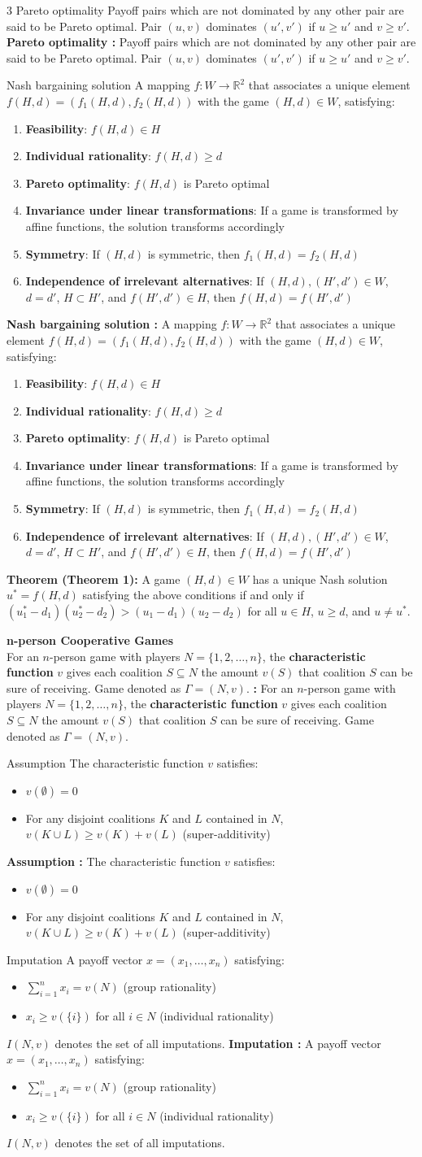 \documentclass[a4paper,landscape,8pt]{article}
\newcommand{\subheading}[1]{\vspace{1pt}\noindent\textbf{\textcolor{subheading}{#1}}}
\newcommand{\definition}[2][]{\vspace{1pt}\noindent%
  \ifx\relax#1\relax%
    #2%
  \else%
    \textbf{#1 :} #2%
  \fi}
\newcommand{\theorem}[2]{\vspace{1pt}\noindent\textbf{Theorem (#1):} #2}
\begin{document}
\begin{multicols}{3}
	\definition[Pareto optimality]{Payoff pairs which are not dominated by any other pair are said to be Pareto optimal. Pair $(u, v)$ dominates $(u', v')$ if $u \geq u'$ and $v \geq v'$.}

	\definition[Nash bargaining solution]{A mapping $f : W \rightarrow \mathbb{R}^2$ that associates a unique element $f(H, d) = (f_1(H, d), f_2(H, d))$ with the game $(H, d) \in W$, satisfying:
		\begin{enumerate}[leftmargin=10pt,itemsep=0pt]
			\item \textbf{Feasibility}: $f(H, d) \in H$
			\item \textbf{Individual rationality}: $f(H, d) \geq d$
			\item \textbf{Pareto optimality}: $f(H, d)$ is Pareto optimal
			\item \textbf{Invariance under linear transformations}: If a game is transformed by affine functions, the solution transforms accordingly
			\item \textbf{Symmetry}: If $(H, d)$ is symmetric, then $f_1(H, d) = f_2(H, d)$
			\item \textbf{Independence of irrelevant alternatives}: If $(H, d),(H', d') \in W$, $d = d'$, $H \subset H'$, and $f(H', d') \in H$, then $f(H, d) = f(H', d')$
		\end{enumerate}}

	\theorem{Theorem 1}{A game $(H, d) \in W$ has a unique Nash solution $u^* = f(H, d)$ satisfying the above conditions if and only if $(u^*_1 - d_1)(u^*_2 - d_2) > (u_1 - d_1)(u_2 - d_2)$ for all $u \in H$, $u \geq d$, and $u \neq u^*$.}

	\subheading{n-person Cooperative Games}\\
	\definition{For an $n$-person game with players $N = \{1, 2, \ldots, n\}$, the \textbf{characteristic function} $v$ gives each coalition $S \subseteq N$ the amount $v(S)$ that coalition $S$ can be sure of receiving. Game denoted as $\Gamma = (N, v)$.}

	\definition[Assumption]{The characteristic function $v$ satisfies:
		\begin{itemize}[leftmargin=10pt,itemsep=0pt]
			\item $v(\emptyset) = 0$
			\item For any disjoint coalitions $K$ and $L$ contained in $N$, $v(K \cup L) \geq v(K) + v(L)$ (super-additivity)
		\end{itemize}}

	\definition[Imputation]{A payoff vector $x = (x_1, \ldots, x_n)$ satisfying:
		\begin{itemize}[leftmargin=10pt,itemsep=0pt]
			\item $\sum_{i=1}^n x_i = v(N)$ (group rationality)
			\item $x_i \geq v(\{i\})$ for all $i \in N$ (individual rationality)
		\end{itemize}
		$I(N, v)$ denotes the set of all imputations.}


\end{multicols}
\end{document}
